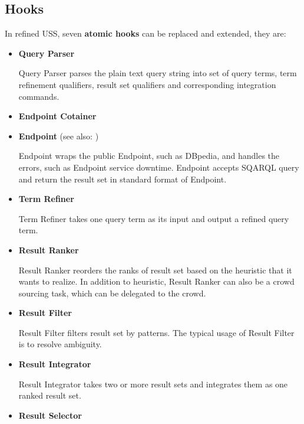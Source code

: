 \documentclass[letterpaper,10pt,english]{sphinxmanual}
\begin{document}
\subsection{Hooks}
\label{docs/uss:hooks}
In refined USS, seven \textbf{atomic hooks} can be replaced and extended, they are:
\begin{itemize}
\item {} 
\textbf{Query Parser}

Query Parser parses the plain text query string into set of query terms, term refinement qualifiers, result set qualifiers and corresponding integration commands.

\item {} 
\textbf{Endpoint Cotainer}

\end{itemize}
\label{docs/uss:endpoint}\begin{itemize}
\item {} 
\textbf{Endpoint} (see also: {\hyperref[docs/api:Endpoint]{}})

Endpoint wraps the public Endpoint, such as DBpedia, and handles the errors, such as Endpoint service downtime. Endpoint accepts SQARQL query and return the result set in standard format of Endpoint.

\item {} 
\textbf{Term Refiner}

Term Refiner takes one query term as its input and output a refined query term.

\item {} 
\textbf{Result Ranker}

Result Ranker reorders the ranks of result set based on the heuristic that it wants to realize. In addition to heuristic, Result Ranker can also be a crowd sourcing task, which can be delegated to the crowd.

\item {} 
\textbf{Result Filter}

Result Filter filters result set by patterns. The typical usage of Result Filter is to resolve ambiguity.

\end{itemize}
\begin{itemize}
\item {} 
\textbf{Result Integrator}

Result Integrator takes two or more result sets and integrates them as one ranked result set.

\item {} 
\textbf{Result Selector}

\end{itemize}
\end{document}
